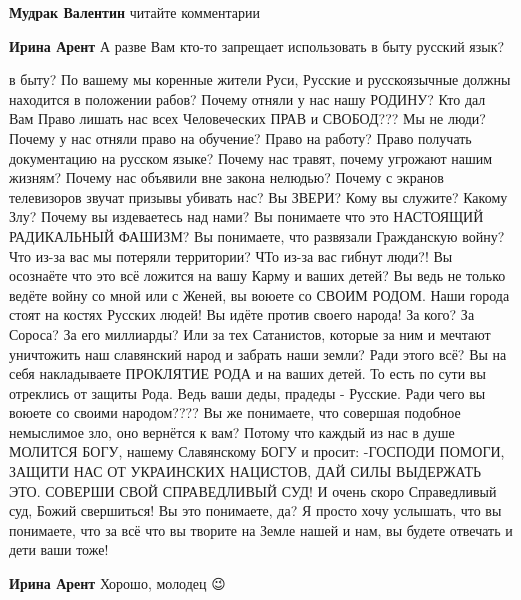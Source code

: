 \begin{itemize}
\begin{itemize}
\textbf{Мудрак Валентин} читайте комментарии


\textbf{Ирина Арент} А разве Вам кто-то запрещает использовать в быту русский язык?


в быту? По вашему мы коренные жители Руси, Русские и русскоязычные должны
находится в положении рабов? Почему отняли у нас нашу РОДИНУ? Кто дал Вам Право
лишать нас всех Человеческих ПРАВ и СВОБОД??? Мы не люди? Почему у нас отняли
право на обучение? Право на работу? Право получать документацию на русском
языке? Почему нас травят, почему угрожают нашим жизням? Почему нас объявили вне
закона нелюдью? Почему с экранов телевизоров звучат призывы убивать нас? Вы
ЗВЕРИ? Кому вы служите? Какому Злу? Почему вы издеваетесь над нами? Вы
понимаете что это НАСТОЯЩИЙ РАДИКАЛЬНЫЙ ФАШИЗМ? Вы понимаете, что развязали
Гражданскую войну? Что из-за вас мы потеряли территории? ЧТо из-за вас гибнут
люди?! Вы осознаёте что это всё ложится на вашу Карму и ваших детей? Вы ведь не
только ведёте войну со мной или с Женей, вы воюете со СВОИМ РОДОМ. Наши города
стоят на костях Русских людей! Вы идёте против своего народа! За кого? За
Сороса? За его миллиарды? Или за тех Сатанистов, которые за ним и мечтают
уничтожить наш славянский народ и забрать наши земли? Ради этого всё? Вы на
себя накладываете ПРОКЛЯТИЕ РОДА и на ваших детей. То есть по сути вы отреклись
от защиты Рода. Ведь ваши деды, прадеды - Русские. Ради чего вы воюете со
своими народом???? Вы же понимаете, что совершая подобное немыслимое зло, оно
вернётся к вам? Потому что каждый из нас в душе МОЛИТСЯ БОГУ, нашему
Славянскому БОГУ и просит: -ГОСПОДИ ПОМОГИ, ЗАЩИТИ НАС ОТ УКРАИНСКИХ НАЦИСТОВ,
ДАЙ СИЛЫ ВЫДЕРЖАТЬ ЭТО. СОВЕРШИ СВОЙ СПРАВЕДЛИВЫЙ СУД! И очень скоро
Справедливый суд, Божий свершиться! Вы это понимаете, да? Я просто хочу
услышать, что вы понимаете, что за всё что вы творите на Земле нашей и нам, вы
будете отвечать и дети ваши тоже!


\textbf{Ирина Арент} Хорошо, молодец 😉

\end{itemize}



\end{itemize}
